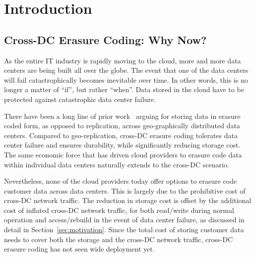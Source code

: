 \section{Introduction}

\subsection{Cross-DC Erasure Coding: Why Now?}

As the entire IT industry is rapidly moving to the cloud, more and more data
centers are being built all over the globe. The event that one of the data
centers will fail catastrophically becomes inevitable over time. In other words,
this is no longer a matter of ``if'', but rather ``when''. 
Data stored in the
cloud have to be protected against catastrophic data center failure.

There have been a long line of prior work~\cite{oceanstore:asplos00, pond:fast03,
weatherspoon2005long, hail:ccs09, racs:socc10, hu12nccloud} arguing for storing data
in erasure coded form, as opposed to replication, across geo-graphically
distributed data centers. Compared to geo-replication, cross-DC erasure coding
tolerates data center failure and ensures durability, while significantly
reducing storage cost. The same economic force that has driven cloud providers to
erasure code data within individual data centers naturally extends to the
cross-DC scenario.

Nevertheless, none of the cloud providers today offer options to erasure code
customer data across data centers. This is largely due to the prohibitive cost
of cross-DC network traffic. The reduction in storage cost is offset by the additional cost of inflated cross-DC network traffic, for both read/write during
normal operation and access/rebuild in the event of data center failure, as
discussed in detail in Section~\ref{sec:motivation}. Since the total cost of
storing customer data needs to cover both the storage and the cross-DC network
traffic, cross-DC erasure coding has not seen wide deployment yet.

